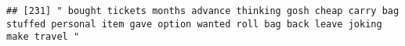\documentclass[
]{article}
\begin{document}
\begin{verbatim}
## [231] " bought tickets months advance thinking gosh cheap carry bag stuffed personal item gave option wanted roll bag back leave joking make travel "                                                                                                                                                                                                                                                                                                                                                                                                                                                                                                                                                                                                                                                                                                                                                                                                                                                                                                                                                                                                                                                                                                                                                                                                                                                                                                                                                                                                                                                                                                                                                                                                                                                 

\end{verbatim}
\end{document}
